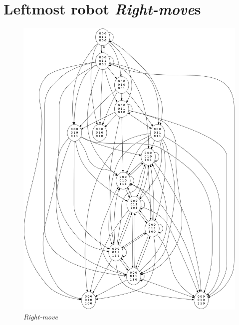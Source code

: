 \documentclass[11pt, a4paper]{article}
\theoremstyle{plain}
\theoremstyle{definition}
\theoremstyle{remark}
\begin{document}
\section{Leftmost robot \emph{Right-move}s}
\begin{figure}[H]
\includegraphics[scale=0.40]{graph_images/graph_leftmost_right.jpg}
\caption{\emph{Right-move}}
\label{graph:leftmost_right}
\end{figure}
\end{document}
